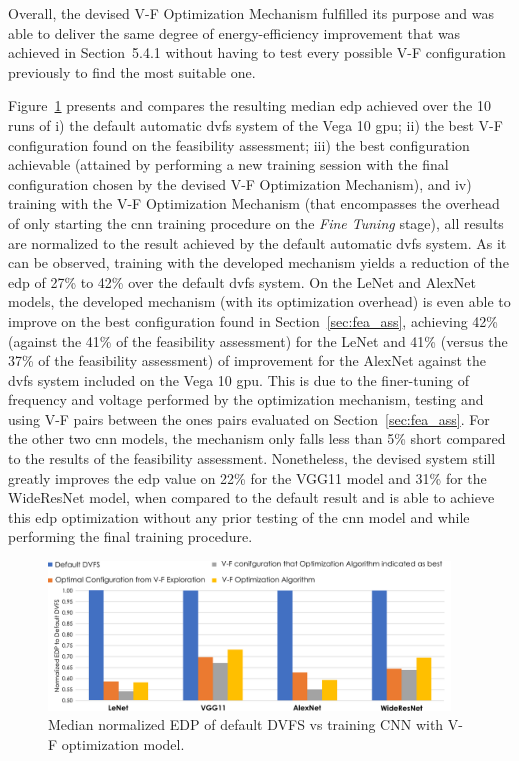 Overall, the devised V-F Optimization Mechanism fulfilled its purpose and was able to deliver the same degree of energy-efficiency improvement that was achieved in Section~5.4.1 without having to test every possible V-F configuration previously to find the most suitable one. 


Figure~\ref{fig:Algori_comp} presents and compares the resulting median \acrshort{edp} achieved over the 10 runs of 
i) the default automatic \acrshort{dvfs} system of the Vega 10 \acrshort{gpu}; 
ii) the best V-F configuration found on the feasibility assessment; 
iii) the best configuration achievable (attained by performing a new training session with the final configuration chosen by the devised V-F Optimization Mechanism), and 
iv) training with the V-F Optimization Mechanism (that encompasses the overhead of only starting the \acrshort{cnn} training procedure on the \textit{Fine Tuning} stage), all results are normalized to the result achieved by the default automatic \acrshort{dvfs} system. 
As it can be observed, training with the developed mechanism yields a reduction of the \acrshort{edp} of 27\% to 42\% over the default \acrshort{dvfs} system. On the LeNet and AlexNet models, the developed mechanism (with its optimization overhead) is even able to improve on the best configuration found in Section~\ref{sec:fea_ass}, achieving 42\% (against the 41\% of the feasibility assessment) for the LeNet and 41\% (versus the 37\% of the feasibility assessment) of improvement for the AlexNet against the \acrshort{dvfs} system included on the Vega 10 \acrshort{gpu}. This is due to the finer-tuning of frequency and voltage performed by the optimization mechanism, testing and using V-F pairs between the ones pairs evaluated on Section~\ref{sec:fea_ass}. For the other two \acrshort{cnn} models, the mechanism only falls less than 5\% short compared to the results of the feasibility assessment. Nonetheless, the devised system still greatly improves the \acrshort{edp} value on 22\% for the VGG11 model and 31\% for the WideResNet model, when compared to the default result and is able to achieve this \acrshort{edp} optimization without any prior testing of the \acrshort{cnn} model and while performing the final training procedure.





\begin{figure}[htb]
    \centering
        \includegraphics[width=0.95\textwidth]{Figures/Application To Deep Learning/Algorithm_Opt_comp.pdf}
        \caption{Median normalized EDP of default DVFS vs training CNN with V-F optimization model.}
    \label{fig:Algori_comp}
\end{figure}

